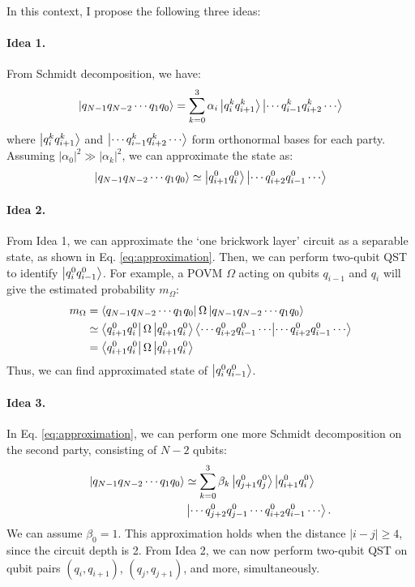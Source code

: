 \documentclass[a4paper, 11pt]{article}
\begin{document}
In this context, I propose the following three ideas:
\paragraph{Idea 1. }
From Schmidt decomposition, we have:
\begin{align}
  \ket{q_{N-1} q_{N-2} \cdots q_{1} q_{0}} = \sum_{k=0}^{3} \alpha_{i} \ket{q_i^k q_{i+1}^k}\ket{ \cdots q_{i-1}^k q_{i+2}^k \cdots}
  \label{eq:schmidt_decomposition_brickwork}
\end{align}
where $\ket{q_i^k q_{i+1}^k}$ and $\ket{\cdots q_{i-1}^k q_{i+2}^k \cdots}$ form orthonormal bases for each party. 
Assuming $|\alpha_0|^2 \gg |\alpha_k|^2$, we can approximate the state as:
\begin{align}
  \ket{q_{N-1} q_{N-2} \cdots q_{1} q_{0}} \simeq \ket{q_{i+1}^0 q_{i}^0}\ket{ \cdots q_{i+2}^0 q_{i-1}^0 \cdots}
  \label{eq:approximation}
\end{align}

\paragraph{Idea 2. }
From Idea 1, we can approximate the `one brickwork layer' circuit as a separable state, as shown in Eq. \ref{eq:approximation}.
Then, we can perform two-qubit QST to identify $\ket{q_i^0 q_{i-1}^0}$. 
For example, a POVM $\Omega$ acting on qubits $q_{i-1}$ and $q_i$ will give the estimated probability $m_{\Omega}$:
\begin{align}
  m_{\Omega}  &= \bra{q_{N-1} q_{N-2} \cdots q_{1} q_{0}} \Omega \ket{q_{N-1} q_{N-2} \cdots q_{1} q_{0}} \nonumber \\
              &\simeq \bra{q_{i+1}^0 q_{i}^0} \Omega \ket{q_{i+1}^0 q_{i}^0} \bra{\cdots q_{i+2}^0 q_{i-1}^0 \cdots} \ket{\cdots q_{i+2}^0 q_{i-1}^0 \cdots} \\
              &= \bra{q_{i+1}^0 q_{i}^0} \Omega \ket{q_{i+1}^0 q_{i}^0} \nonumber
\end{align}
Thus, we can find approximated state of $\ket{q_i^0 q_{i-1}^0}$.

\paragraph{Idea 3. }
In Eq. \ref{eq:approximation}, we can perform one more Schmidt decomposition on the second party, consisting of $N-2$ qubits:
\begin{align}
  \ket{q_{N-1} q_{N-2} \cdots q_{1} q_{0}}  &\simeq \sum_{k=0}^{3} \beta_{k} \ket{q_{j+1}^0 q_{j}^0}\ket{q_{i+1}^0 q_{i}^0} \nonumber \\
                                            &\ket{\cdots q_{j+2}^0 q_{j-1}^0 \cdots q_{i+2}^0 q_{i-1}^0 \cdots}.
  \label{eq:approximation2}
\end{align}
We can assume $\beta_0 = 1$. This approximation holds when the distance $|i - j| \geq 4$, since the circuit depth is 2. 
From Idea 2, we can now perform two-qubit QST on qubit pairs $(q_i, q_{i+1})$, $(q_j, q_{j+1})$, and more, simultaneously.
\end{document}
